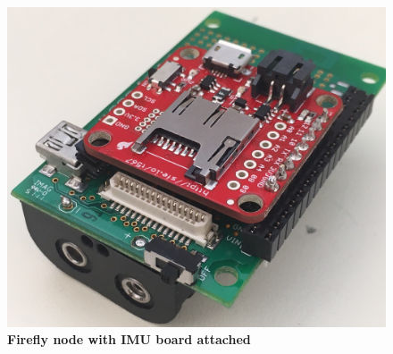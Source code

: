 \documentclass[conference]{IEEEtran}
\begin{document}
\begin{figure}[ht]
  \centering
  \includegraphics[width=0.8\columnwidth]{figs/cropped2}
  \caption{{\bf Firefly node with IMU board attached}}
  \label{fig:ff}
\end{figure}
\end{document}
